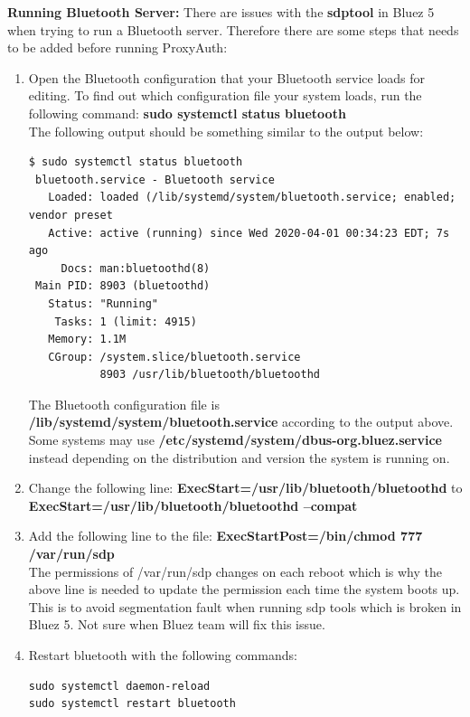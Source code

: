 \documentclass[letterpaper,twocolumn,10pt]{article}
\begin{document}
\textbf{Running Bluetooth Server:}
There are issues with the \textbf{sdptool} in Bluez 5 when trying to run a Bluetooth server. Therefore there are some steps that needs to be added before running ProxyAuth:
\begin{enumerate}[noitemsep]
\item Open the Bluetooth configuration that your Bluetooth service loads for editing. To find out which configuration file your system loads, run the following command: \textbf{sudo systemctl status bluetooth}\\
The following output should be something similar to the output below:
{\small
\begin{lstlisting}
$ sudo systemctl status bluetooth
 bluetooth.service - Bluetooth service
   Loaded: loaded (/lib/systemd/system/bluetooth.service; enabled; vendor preset
   Active: active (running) since Wed 2020-04-01 00:34:23 EDT; 7s ago
     Docs: man:bluetoothd(8)
 Main PID: 8903 (bluetoothd)
   Status: "Running"
    Tasks: 1 (limit: 4915)
   Memory: 1.1M
   CGroup: /system.slice/bluetooth.service
           8903 /usr/lib/bluetooth/bluetoothd
\end{lstlisting}
}

The Bluetooth configuration file is \textbf{/lib/systemd/system/bluetooth.service} according to the output above. Some systems may use \textbf{/etc/systemd/system/dbus-org.bluez.service} instead depending on the distribution and version the system is running on.

\item Change the following line: \textbf{ExecStart=/usr/lib/bluetooth/bluetoothd} to \textbf{ExecStart=/usr/lib/bluetooth/bluetoothd --compat}

\item Add the following line to the file: \textbf{ExecStartPost=/bin/chmod 777 /var/run/sdp}\\
The permissions of /var/run/sdp changes on each reboot which is why the above line is needed to update the permission each time the system boots up. This is to avoid segmentation fault when running sdp tools which is broken in Bluez 5. Not sure when Bluez team will fix this issue.

\item Restart bluetooth with the following commands:
{\small
\begin{lstlisting}
sudo systemctl daemon-reload
sudo systemctl restart bluetooth
\end{lstlisting}
}
\end{enumerate}
\end{document}
